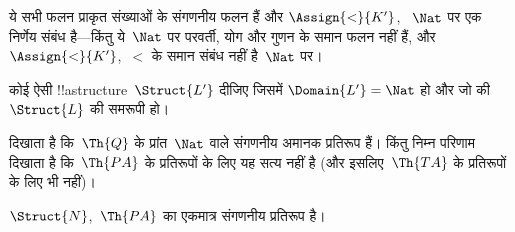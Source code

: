 \documentclass[../../../include/open-logic-section]{subfiles}
\begin{document}
\begin{ex}
ये सभी फलन प्राकृत संख्याओं के संगणनीय फलन हैं और $\Assign{<}{K'}$,
~$\Nat$ पर एक निर्णेय संबंध है---किंतु ये~$\Nat$ पर परवर्ती, योग और गुणन
के समान फलन नहीं हैं, और $\Assign{<}{K'}$,~$<$ के समान संबंध नहीं
है~$\Nat$ पर।
\end{ex}

\begin{prob}
कोई ऐसी !!a{structure}~$\Struct{L'}$ दीजिए जिसमें
$\Domain{L'} = \Nat$ हो और जो
 की~$\Struct{L}$ की समरूपी हो।
\end{prob}

\begin{explain}
 दिखाता है कि~$\Th{Q}$ के प्रांत~$\Nat$ वाले
संगणनीय अमानक प्रतिरूप हैं। किंतु निम्न परिणाम दिखाता है कि~$\Th{PA}$ के
प्रतिरूपों के लिए यह सत्य नहीं है (और इसलिए~$\Th{TA}$ के प्रतिरूपों के लिए
भी नहीं)।
\end{explain}

\begin{thm}[टेनेनबाउम का प्रमेय]
$\Struct{N}$,~$\Th{PA}$ का एकमात्र संगणनीय प्रतिरूप है।
\end{thm}
  
\end{document}
